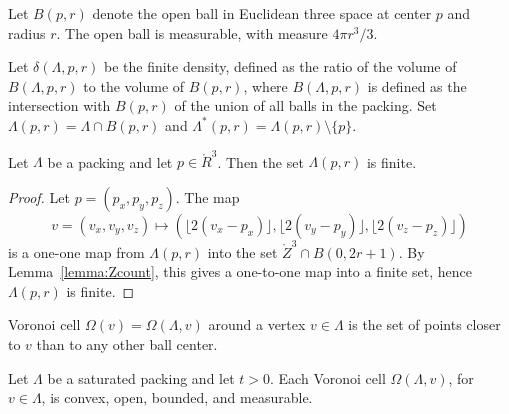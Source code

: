


  Let $B(p,r)$ denote the open ball in
Euclidean three space at center $p$ and radius $r$.  The open ball
is measurable, with measure $4\pi r^3/3$.



Let $\delta(\Lambda,p,r)$ be the finite density, defined as the
ratio of the volume of $B(\Lambda,p,r)$ to the volume of $B(p,r)$,
where $B(\Lambda,p,r)$ is defined as the intersection with
$B(p,r)$ of the union of all balls in the packing. Set
$\Lambda(p,r) = \Lambda \cap
B(p,r)$ and $\Lambda^*(p,r) = \Lambda(p,r)\setminus \{p\}$.

\begin{lemma}\label{lemma:Lambda-finite}
Let $\Lambda$ be a packing and let $p\in\ring{R}^3$.
Then the set $\Lambda(p,r)$ is finite.
\end{lemma}

\begin{proof}  Let $p = (p_x,p_y,p_z)$. The map
$$v=(v_x,v_y,v_z)\mapsto (\lfloor 2(v_x-p_x)
\rfloor, \lfloor 2(v_y-p_y) \rfloor, \lfloor 2(v_z-p_z) \rfloor)$$
is a one-one map from $\Lambda(p,r)$ into the set $\ring{Z}^3\cap B(0,2
r
 + 1)$.  By Lemma~\ref{lemma:Zcount}, this gives a one-to-one map
 into a finite set, hence $\Lambda(p,r)$ is finite.
\end{proof}


\begin{definition}\label{def:voronoi} Voronoi cell
$\Omega(v)=\Omega(\Lambda,v)$ around a
vertex $v\in \Lambda$ is the set of points closer to $v$ than to
any other ball center. 
\end{definition}

\begin{lemma}\label{80} Let $\Lambda$ be a saturated packing and let $t>0$.
Each Voronoi cell $\Omega(\Lambda,v)$, for $v\in\Lambda$, is
convex, open, bounded, and measurable.
\end{lemma}

